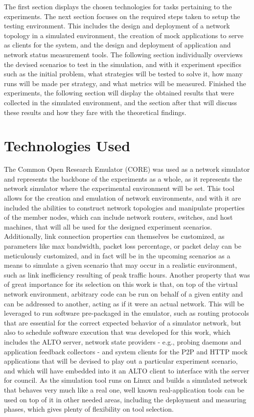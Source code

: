     The first section displays the chosen technologies for tasks pertaining to the experiments.
    The next section focuses on the required steps taken to setup the testing environment.
    This includes the design and deployment of a network topology in a simulated environment, the creation of mock applications to serve as clients for the system, and the design and deployment of application and network status measurement tools.
    The following section individually overviews the devised scenarios to test in the simulation, and with it experiment specifics such as the initial problem, what strategies will be tested to solve it, how many runs will be made per strategy, and what metrics will be measured.
    Finished the experiments, the following section will display the obtained results that were collected in the simulated environment, and the section after that will discuss these results and how they fare with the theoretical findings.

\section{Technologies Used}

    The Common Open Research Emulator (CORE) \cite{core} was used as a network simulator and represents the backbone of the experiments as a whole, as it represents the network simulator where the experimental environment will be set.
    This tool allows for the creation and emulation of network environments, and with it are included the abilities to construct network topologies and manipulate properties of the member nodes, which can include network routers, switches, and host machines, that will all be used for the designed experiment scenarios.
    Additionally, link connection properties can themselves be customized, as parameters like max bandwidth, packet loss percentage, or packet delay can be meticulously customized, and in fact will be in the upcoming scenarios as a means to simulate a given scenario that may occur in a realistic environment, such as link inefficiency resulting of peak traffic hours.
    Another property that was of great importance for its selection on this work is that, on top of the virtual network environment, arbitrary code can be run on behalf of a given entity and can be addressed to another, acting as if it were an actual network.
    This will be leveraged to run software pre-packaged in the emulator, such as routing protocols that are essential for the correct expected behavior of a simulator network, but also to schedule software execution that was developed for this work, which includes the ALTO server, network state providers - e.g., probing daemons and application feedback collectors - and system clients for the P2P and HTTP mock applications that will be devised to play out a particular experiment scenario, and which will have embedded into it an ALTO client to interface with the server for council.
    As the simulation tool runs on Linux and builds a simulated network that behaves very much like a real one, well known real-application tools can be used on top of it in other needed areas, including the deployment and measuring phases, which gives plenty of flexibility on tool selection.

